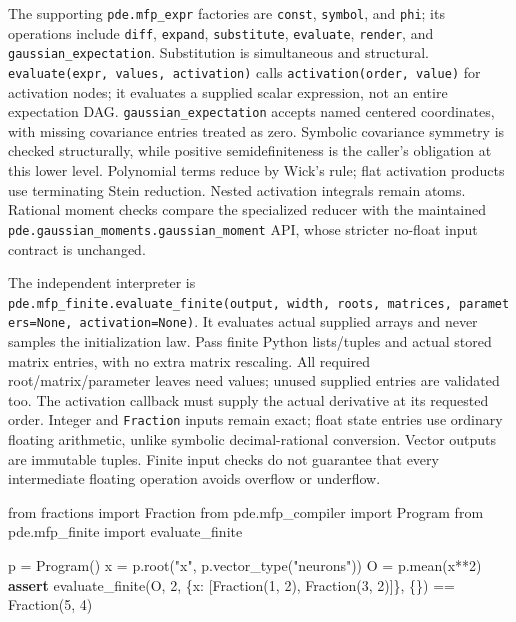 \documentclass[
  11pt,
]{article}
\newenvironment{Shaded}{\begin{snugshade}}{\end{snugshade}}
\newcommand{\ControlFlowTok}[1]{\textcolor[rgb]{0.00,0.23,0.31}{\textbf{#1}}}
\newcommand{\DecValTok}[1]{\textcolor[rgb]{0.68,0.00,0.00}{#1}}
\newcommand{\ImportTok}[1]{\textcolor[rgb]{0.00,0.46,0.62}{#1}}
\newcommand{\NormalTok}[1]{\textcolor[rgb]{0.00,0.23,0.31}{#1}}
\newcommand{\OperatorTok}[1]{\textcolor[rgb]{0.37,0.37,0.37}{#1}}
\newcommand{\StringTok}[1]{\textcolor[rgb]{0.13,0.47,0.30}{#1}}
\theoremstyle{definition}
\theoremstyle{plain}
\theoremstyle{plain}
\theoremstyle{plain}
\theoremstyle{remark}
\begin{document}
The supporting \texttt{pde.mfp\_expr} factories are \texttt{const},
\texttt{symbol}, and \texttt{phi}; its operations include \texttt{diff},
\texttt{expand}, \texttt{substitute}, \texttt{evaluate},
\texttt{render}, and \texttt{gaussian\_expectation}. Substitution is
simultaneous and structural.
\texttt{evaluate(expr,\ values,\ activation)} calls
\texttt{activation(order,\ value)} for activation nodes; it evaluates a
supplied scalar expression, not an entire expectation DAG.
\texttt{gaussian\_expectation} accepts named centered coordinates, with
missing covariance entries treated as zero. Symbolic covariance symmetry
is checked structurally, while positive semidefiniteness is the caller's
obligation at this lower level. Polynomial terms reduce by Wick's rule;
flat activation products use terminating Stein reduction. Nested
activation integrals remain atoms. Rational moment checks compare the
specialized reducer with the maintained
\texttt{pde.gaussian\_moments.gaussian\_moment} API, whose stricter
no-float input contract is unchanged.

The independent interpreter is
\texttt{pde.mfp\_finite.evaluate\_finite(output,\ width,\ roots,\ matrices,\ parameters=None,\ activation=None)}.
It evaluates actual supplied arrays and never samples the initialization
law. Pass finite Python lists/tuples and actual stored matrix entries,
with no extra matrix rescaling. All required root/matrix/parameter
leaves need values; unused supplied entries are validated too. The
activation callback must supply the actual derivative at its requested
order. Integer and \texttt{Fraction} inputs remain exact; float state
entries use ordinary floating arithmetic, unlike symbolic
decimal-rational conversion. Vector outputs are immutable tuples. Finite
input checks do not guarantee that every intermediate floating operation
avoids overflow or underflow.

\begin{Shaded}
\begin{Highlighting}[]
\ImportTok{from}\NormalTok{ fractions }\ImportTok{import}\NormalTok{ Fraction}
\ImportTok{from}\NormalTok{ pde.mfp\_compiler }\ImportTok{import}\NormalTok{ Program}
\ImportTok{from}\NormalTok{ pde.mfp\_finite }\ImportTok{import}\NormalTok{ evaluate\_finite}

\NormalTok{p }\OperatorTok{=}\NormalTok{ Program()}
\NormalTok{x }\OperatorTok{=}\NormalTok{ p.root(}\StringTok{"x"}\NormalTok{, p.vector\_type(}\StringTok{"neurons"}\NormalTok{))}
\NormalTok{O }\OperatorTok{=}\NormalTok{ p.mean(x}\OperatorTok{**}\DecValTok{2}\NormalTok{)}
\ControlFlowTok{assert}\NormalTok{ evaluate\_finite(O, }\DecValTok{2}\NormalTok{, \{x: [Fraction(}\DecValTok{1}\NormalTok{, }\DecValTok{2}\NormalTok{), Fraction(}\DecValTok{3}\NormalTok{, }\DecValTok{2}\NormalTok{)]\}, \{\}) }\OperatorTok{==}\NormalTok{ Fraction(}\DecValTok{5}\NormalTok{, }\DecValTok{4}\NormalTok{)}
\end{Highlighting}
\end{Shaded}
\end{document}
